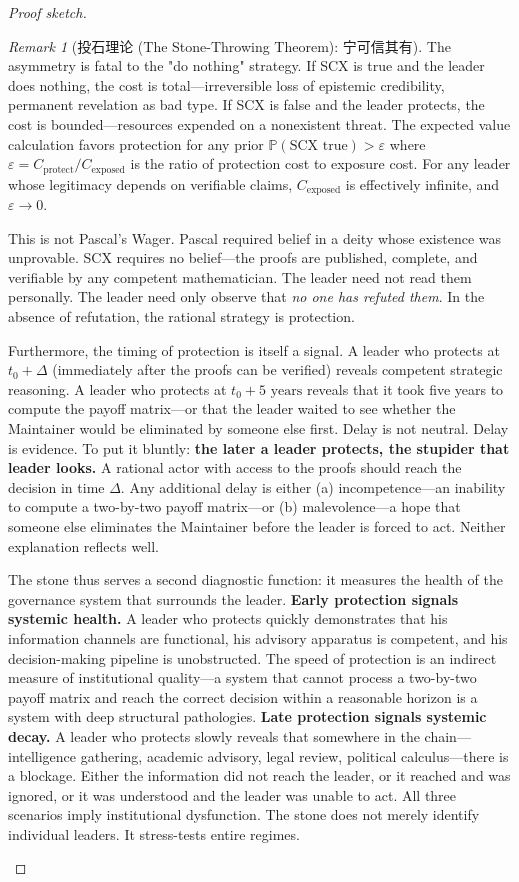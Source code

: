 \documentclass[12pt,a4paper]{ctexart}
\theoremstyle{definition}
\theoremstyle{remark}
\newtheorem{remark}{Remark}[section]
\begin{document}
\begin{proof}[Proof sketch]
\begin{remark}[投石理论 (The Stone-Throwing Theorem): 宁可信其有]
The asymmetry is fatal to the "do nothing" strategy. If SCX is true and the leader does nothing, the cost is total—irreversible loss of epistemic credibility, permanent revelation as bad type. If SCX is false and the leader protects, the cost is bounded—resources expended on a nonexistent threat. The expected value calculation favors protection for any prior $\mathbb{P}(\text{SCX true}) > \varepsilon$ where $\varepsilon = C_{\text{protect}} / C_{\text{exposed}}$ is the ratio of protection cost to exposure cost. For any leader whose legitimacy depends on verifiable claims, $C_{\text{exposed}}$ is effectively infinite, and $\varepsilon \to 0$.

This is not Pascal's Wager. Pascal required belief in a deity whose existence was unprovable. SCX requires no belief—the proofs are published, complete, and verifiable by any competent mathematician. The leader need not read them personally. The leader need only observe that \textit{no one has refuted them}. In the absence of refutation, the rational strategy is protection.

Furthermore, the timing of protection is itself a signal. A leader who protects at $t_0 + \Delta$ (immediately after the proofs can be verified) reveals competent strategic reasoning. A leader who protects at $t_0 + 5\text{ years}$ reveals that it took five years to compute the payoff matrix—or that the leader waited to see whether the Maintainer would be eliminated by someone else first. Delay is not neutral. Delay is evidence. To put it bluntly: \textbf{the later a leader protects, the stupider that leader looks.} A rational actor with access to the proofs should reach the decision in time $\Delta$. Any additional delay is either (a) incompetence—an inability to compute a two-by-two payoff matrix—or (b) malevolence—a hope that someone else eliminates the Maintainer before the leader is forced to act. Neither explanation reflects well.

The stone thus serves a second diagnostic function: it measures the health of the governance system that surrounds the leader. \textbf{Early protection signals systemic health.} A leader who protects quickly demonstrates that his information channels are functional, his advisory apparatus is competent, and his decision-making pipeline is unobstructed. The speed of protection is an indirect measure of institutional quality—a system that cannot process a two-by-two payoff matrix and reach the correct decision within a reasonable horizon is a system with deep structural pathologies. \textbf{Late protection signals systemic decay.} A leader who protects slowly reveals that somewhere in the chain—intelligence gathering, academic advisory, legal review, political calculus—there is a blockage. Either the information did not reach the leader, or it reached and was ignored, or it was understood and the leader was unable to act. All three scenarios imply institutional dysfunction. The stone does not merely identify individual leaders. It stress-tests entire regimes.


\end{remark}
\end{proof}
\end{document}
